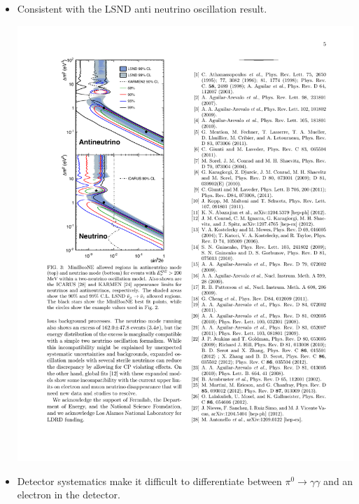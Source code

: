 \documentclass[mathserif,18pt,xcolor=table]{beamer}
\begin{document}
\begin{frame}
{\begin{columns}
\begin{column}{.5\linewidth}
\begin{itemize}
        \item Consistent with the LSND anti neutrino oscillation result.
          \begin{center}
            \includegraphics[width=.6\linewidth]{../figures/miniboone_regions.pdf}
          \end{center}
        \item Detector systematics make it difficult to differentiate between $\pi^0\rightarrow\gamma\gamma$ and an electron in the detector.
        \end{itemize}
      \end{column}
    \end{columns}
  }
\end{frame}
\end{document}
